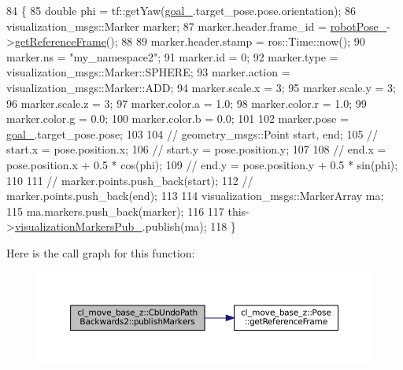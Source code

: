 \begin{DoxyCode}
84 \{
85   \textcolor{keywordtype}{double} phi = tf::getYaw(\hyperlink{classcl__move__base__z_1_1CbUndoPathBackwards2_ad119c38ee9cb341c9b468682d1794538}{goal\_}.target\_pose.pose.orientation);
86   visualization\_msgs::Marker marker;
87   marker.header.frame\_id = \hyperlink{classcl__move__base__z_1_1CbUndoPathBackwards2_a2d398dac07efaca840fbcea31957cf7a}{robotPose\_}->\hyperlink{classcl__move__base__z_1_1Pose_af8c2dc151e74aa8da6b283d1c8563051}{getReferenceFrame}();
88 
89   marker.header.stamp = ros::Time::now();
90   marker.ns = \textcolor{stringliteral}{"my\_namespace2"};
91   marker.id = 0;
92   marker.type = visualization\_msgs::Marker::SPHERE;
93   marker.action = visualization\_msgs::Marker::ADD;
94   marker.scale.x = 3;
95   marker.scale.y = 3;
96   marker.scale.z = 3;
97   marker.color.a = 1.0;
98   marker.color.r = 1.0;
99   marker.color.g = 0.0;
100   marker.color.b = 0.0;
101 
102   marker.pose = \hyperlink{classcl__move__base__z_1_1CbUndoPathBackwards2_ad119c38ee9cb341c9b468682d1794538}{goal\_}.target\_pose.pose;
103 
104   \textcolor{comment}{// geometry\_msgs::Point start, end;}
105   \textcolor{comment}{// start.x = pose.position.x;}
106   \textcolor{comment}{// start.y = pose.position.y;}
107 
108   \textcolor{comment}{// end.x = pose.position.x + 0.5 * cos(phi);}
109   \textcolor{comment}{// end.y = pose.position.y + 0.5 * sin(phi);}
110 
111   \textcolor{comment}{// marker.points.push\_back(start);}
112   \textcolor{comment}{// marker.points.push\_back(end);}
113 
114   visualization\_msgs::MarkerArray ma;
115   ma.markers.push\_back(marker);
116 
117   this->\hyperlink{classcl__move__base__z_1_1CbMoveBaseClientBehaviorBase_aff48fc567ae025b196efd8895b7fb35d}{visualizationMarkersPub\_}.publish(ma);
118 \}
\end{DoxyCode}
Here is the call graph for this function\+:
\nopagebreak
\begin{figure}[H]
\begin{center}
\leavevmode
\includegraphics[width=350pt]{classcl__move__base__z_1_1CbUndoPathBackwards2_afaa039c78eb70ba012d86d8c77b9828c_cgraph}
\end{center}
\end{figure}
\mbox{\label{classcl__move__base__z_1_1CbUndoPathBackwards2_a62f0d53fc341ca6d241637cc0e4b2e30}} 
